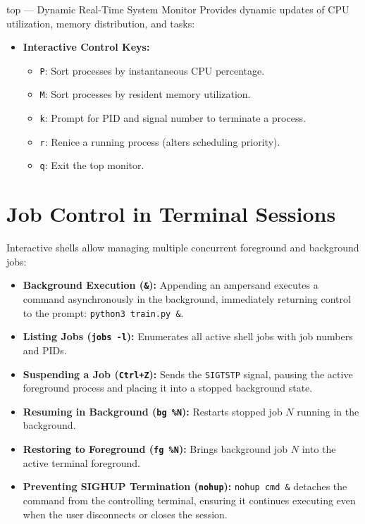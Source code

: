 \begin{commandbox}{top --- Dynamic Real-Time System Monitor}
Provides dynamic updates of CPU utilization, memory distribution, and tasks:
\begin{itemize}[leftmargin=1.5em]
    \item \textbf{Interactive Control Keys:}
    \begin{itemize}
        \item \texttt{P}: Sort processes by instantaneous CPU percentage.
        \item \texttt{M}: Sort processes by resident memory utilization.
        \item \texttt{k}: Prompt for PID and signal number to terminate a process.
        \item \texttt{r}: Renice a running process (alters scheduling priority).
        \item \texttt{q}: Exit the top monitor.
    \end{itemize}
\end{itemize}
\end{commandbox}

\section{Job Control in Terminal Sessions}
Interactive shells allow managing multiple concurrent foreground and background jobs:
\begin{itemize}[leftmargin=1.5em]
    \item \textbf{Background Execution (\texttt{\&}):} Appending an ampersand executes a command asynchronously in the background, immediately returning control to the prompt: \texttt{python3 train.py \&}.
    \item \textbf{Listing Jobs (\texttt{jobs -l}):} Enumerates all active shell jobs with job numbers and PIDs.
    \item \textbf{Suspending a Job (\texttt{Ctrl+Z}):} Sends the \texttt{SIGTSTP} signal, pausing the active foreground process and placing it into a stopped background state.
    \item \textbf{Resuming in Background (\texttt{bg \%N}):} Restarts stopped job $N$ running in the background.
    \item \textbf{Restoring to Foreground (\texttt{fg \%N}):} Brings background job $N$ into the active terminal foreground.
    \item \textbf{Preventing SIGHUP Termination (\texttt{nohup}):} \texttt{nohup cmd \&} detaches the command from the controlling terminal, ensuring it continues executing even when the user disconnects or closes the session.
\end{itemize}

